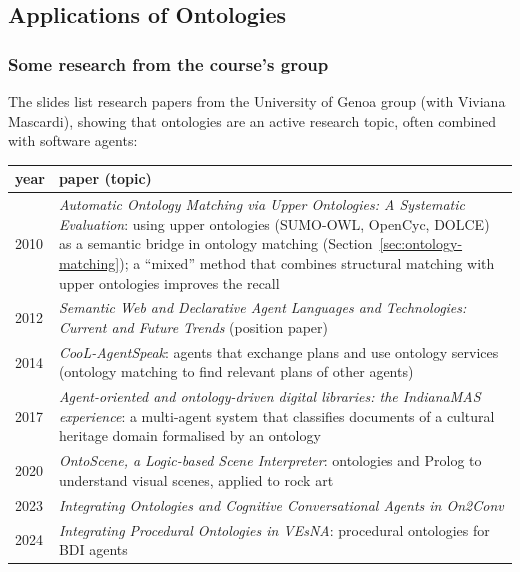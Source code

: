 \subsection{Applications of Ontologies}
\label{sec:ontology-applications}

\subsubsection{Some research from the course's group}

The slides list research papers from the University of Genoa group (with Viviana
Mascardi), showing that ontologies are an active research topic, often combined with
software agents:
\begin{center}
\small
\begin{tabularx}{\linewidth}{@{}l X@{}}
\toprule
\textbf{year} & \textbf{paper (topic)} \\
\midrule
2010 & \emph{Automatic Ontology Matching via Upper Ontologies: A Systematic Evaluation}:
  using upper ontologies (SUMO-OWL, OpenCyc, DOLCE) as a semantic bridge in ontology
  matching (Section~\ref{sec:ontology-matching}); a ``mixed'' method that combines
  structural matching with upper ontologies improves the recall \\
2012 & \emph{Semantic Web and Declarative Agent Languages and Technologies: Current and
  Future Trends} (position paper) \\
2014 & \emph{CooL-AgentSpeak}: agents that exchange plans and use ontology services
  (ontology matching to find relevant plans of other agents) \\
2017 & \emph{Agent-oriented and ontology-driven digital libraries: the IndianaMAS
  experience}: a multi-agent system that classifies documents of a cultural heritage
  domain formalised by an ontology \\
2020 & \emph{OntoScene, a Logic-based Scene Interpreter}: ontologies and Prolog to
  understand visual scenes, applied to rock art \\
2023 & \emph{Integrating Ontologies and Cognitive Conversational Agents in On2Conv} \\
2024 & \emph{Integrating Procedural Ontologies in VEsNA}: procedural ontologies for BDI
  agents \\
\bottomrule
\end{tabularx}
\end{center}

